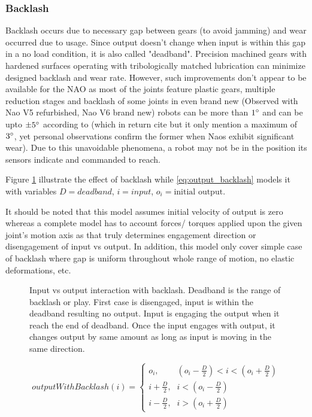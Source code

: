 \documentclass[english, printversion, nomenclature, notitle]{tuvisionthesis} %
\begin{document}
\subsubsection{Backlash}
\label{subsec:backlash}
Backlash occurs due to necessary gap between gears (to avoid jamming) and wear occurred due to usage. Since output doesn't change when input is within this gap in a no load condition, it is also called "deadband". Precision machined gears with hardened surfaces operating with tribologically matched lubrication can minimize designed backlash and wear rate. However, such improvements don't appear to be available for the NAO as most of the joints feature plastic gears, multiple reduction stages and backlash of some joints in even brand new (Observed with Nao V5 refurbished, Nao V6 brand new) robots can be more than $1\degree$ and can be upto $\pm 5\degree$ according to \cite{kastner_automatic_2015} (which in return cite \cite{gouaillier_nao_2008} but it only mention a maximum of $3\degree$, yet personal observations confirm the former when Naos exhibit significant wear). Due to this unavoidable phenomena, a robot may not be in the position its sensors indicate and commanded to reach.

Figure \ref{fig:backlash} illustrate the effect of backlash while \cref{eq:output_backlash} models it with variables $D = deadband$, $i = input$, $o_i = \text{initial output}$. 

It should be noted that this model assumes initial velocity of output is zero whereas a complete model has to account forces/ torques applied upon the given joint's motion axis as that truly determines engagement direction or disengagement of input vs output. In addition, this model only cover simple case of backlash where gap is uniform throughout whole range of motion, no elastic deformations, etc.

\begin{figure}
	\def\svgwidth{\linewidth}
	
	\caption{Input vs output interaction with backlash. Deadband is the range of backlash or play. First case is disengaged, input is within the deadband resulting no output. Input is engaging the output when it reach the end of deadband. Once the input engages with output, it changes output by same amount as long as input is moving in the same direction.}
	\label{fig:backlash}
\end{figure}

\begin{equation}
outputWithBacklash(i) = \begin{cases}
\mbox{$o_i$,} & (o_i - \frac{D}{2}) < i < (o_i + \frac{D}{2}) \\
\mbox{$i + \frac{D}{2}$,} & i < (o_i - \frac{D}{2}) \\
\mbox{$i - \frac{D}{2}$,} & i > (o_i + \frac{D}{2})
\end{cases}
\label{eq:output_backlash}
\end{equation}
\end{document}
